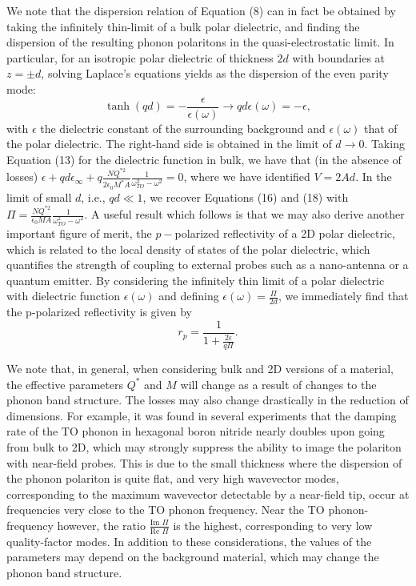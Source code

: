 \documentclass[aps,prb,twocolumn,
	groupedaddress,superscriptaddress,
	amsfonts,amssymb,amsmath,floatfix,
	citeautoscript]{revtex4-1}
\begin{document}
We note that the dispersion relation of Equation (8) can in fact be obtained by taking the infinitely thin-limit of a bulk polar dielectric, and finding the dispersion of the resulting phonon polaritons in the quasi-electrostatic limit. In particular, for an isotropic polar dielectric of thickness $2d$ with boundaries at $z=\pm d$, solving Laplace's equations yields as the dispersion of the even parity mode:
\begin{equation}
\tanh(qd) = -\frac{\epsilon}{\epsilon(\omega)} \rightarrow qd\epsilon(\omega) = -\epsilon,
\end{equation}
with $\epsilon$ the dielectric constant of the surrounding background and $\epsilon(\omega)$ that of the polar dielectric. The right-hand side is obtained in the limit of $d\rightarrow 0$. Taking Equation (13) for the dielectric function in bulk, we have that (in the absence of losses) $\epsilon + qd\epsilon_{\infty} + q\frac{NQ^{*2}}{2\epsilon_0 M^*A}\frac{1}{\omega_{TO}^2-\omega^2} = 0$, where we have identified $V = 2Ad$. In the limit of small $d$, i.e., $qd \ll 1$, we recover Equations (16) and (18) with $\Pi = \frac{NQ^{*2}}{\epsilon_0 MA}\frac{1}{\omega^2_{TO}-\omega^2}$. A useful result which follows is that we may also derive another important figure of merit, the $p-$polarized reflectivity of a 2D polar dielectric, which is related to the local density of states of the polar dielectric, which quantifies the strength of coupling to external probes such as a nano-antenna or a quantum emitter. By considering the infinitely thin limit of a polar dielectric with dielectric function $\epsilon(\omega)$ and defining $\epsilon(\omega) = \frac{\Pi}{2d}$, we immediately find that the p-polarized reflectivity is given by
\begin{equation}
r_p = \frac{1}{1+\frac{2\epsilon}{q\Pi}}.
\end{equation}

 We note that, in general, when considering bulk and 2D versions of a material, the effective parameters $Q^*$ and $M$ will change as a result of changes to the phonon band structure. The losses may also change drastically in the reduction of dimensions. For example, it was found in several experiments that the damping rate of the TO phonon in hexagonal boron nitride nearly doubles upon going from bulk to 2D\cite{gorbachev2011hunting,tran2016quantum}, which may strongly suppress the ability to image the polariton with near-field probes. This is due to the small thickness where the dispersion of the phonon polariton is quite flat, and very high wavevector modes, corresponding to the maximum wavevector detectable by a near-field tip, occur at frequencies very close to the TO phonon frequency. Near the TO phonon-frequency however, the ratio $\frac{\text{Im }\Pi}{\text{Re }\Pi}$ is the highest, corresponding to very low quality-factor modes. In addition to these considerations, the values of the parameters may depend on the background material, which may change the phonon band structure. 
\end{document}

